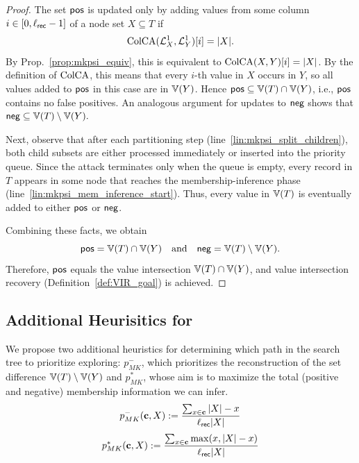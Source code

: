 \begin{proof}
	The set $\mathsf{pos}$ is updated only by adding values from some column $i \in [0, \ell_{\mathsf{rec}}-1]$ of a node set $X \subseteq T$ if
	\[
		\text{ColCA}({\mathcal{L}^1_{X_{}}}, {\mathcal{L}^1_{Y}})[i] = |X|.
	\]
	By Prop.~\ref{prop:mkpsi_equiv}, this is equivalent to
	$\text{ColCA}(X, Y)[i] = |X|$. By the definition of $\text{ColCA}$, this means that every $i$-th value in $X$ occurs in $Y$, so all values added to $\mathsf{pos}$ in this case are in $\Ispace[Y]$. Hence $\posSet \subseteq \Ispace[T] \cap \Ispace[Y]$,
	i.e., $\mathsf{pos}$ contains no false positives. An analogous argument for updates to $\mathsf{neg}$ shows that $\negSet \subseteq \Ispace[T] \setminus \Ispace[Y].$

	Next, observe that after each partitioning step (line~\ref{lin:mkpsi_split_children}), both child subsets are either processed immediately or inserted into the priority queue. Since the attack terminates only when the queue is empty, every record in $T$ appears in some node that reaches the membership-inference phase
	(line~\ref{lin:mkpsi_mem_inference_start}). Thus, every value in $\Ispace[T]$ is eventually added to either $\mathsf{pos}$ or $\mathsf{neg}$.

	Combining these facts, we obtain
	\[
		\posSet = \Ispace[T] \cap \Ispace[Y]
		\quad\text{and}\quad
		\negSet = \Ispace[T] \setminus \Ispace[Y].
	\]
	Therefore, $\mathsf{pos}$ equals the value intersection $\Ispace[T] \cap \Ispace[Y]$,
	and value intersection recovery (Definition~\ref{def:VIR_goal}) is achieved.
\end{proof}

\subsection{Additional Heurisitics for \mkpsiattack{}}\label{ap:IRR:heuristics}

We propose two additional heuristics for determining which path in the search tree to prioritize exploring: $p_{MK}^-$, which prioritizes the reconstruction of the set difference $\Ispace[T] \setminus \Ispace[Y]$ and $p_{MK}^*$, whose aim is to maximize the total (positive and negative) membership information we can infer.
\begin{equation}
    p_{MK}^-(\mathbf{c}, X) := \frac{\sum_{x \in \mathbf{c}} |X| - x}{\ell_{\mathsf{rec}}|X|} 
\end{equation}
\begin{equation}
    p_{MK}^*(\mathbf{c}, X) := \frac{\sum_{x \in \mathbf{c}} \max(x, |X| - x)}{\ell_{\mathsf{rec}}|X|} 
\end{equation}

